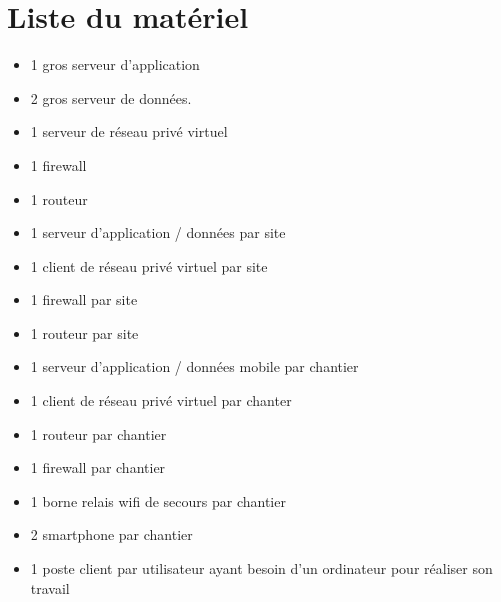 \section{Liste du matériel}
\begin{itemize}
	\item 1 gros serveur d'application
	\item 2 gros serveur de données.
	\item 1 serveur de réseau privé virtuel
    \item 1 firewall
	\item 1 routeur\\

	\item 1 serveur d'application / données par site
	\item 1 client de réseau privé virtuel par site
    \item 1 firewall par site
	\item 1 routeur par site\\

	\item 1 serveur d'application / données mobile par chantier
	\item 1 client de réseau privé virtuel par chanter
	\item 1 routeur par chantier
    \item 1 firewall par chantier
	\item 1 borne relais wifi de secours par chantier
	\item 2 smartphone par chantier\\

	\item 1 poste client par utilisateur ayant besoin d'un ordinateur pour réaliser son travail
\end{itemize}

